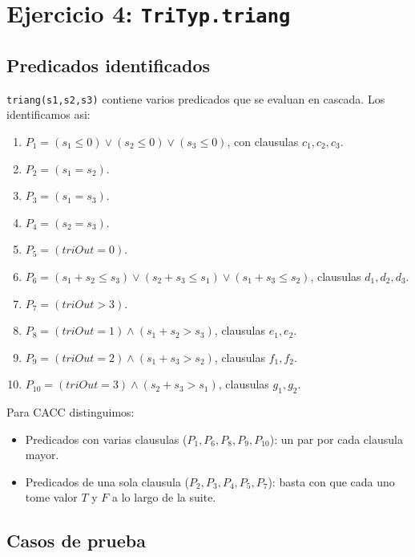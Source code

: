 \documentclass[12pt,a4paper]{article}
\begin{document}
\section{Ejercicio 4: \texttt{TriTyp.triang}}

\subsection{Predicados identificados}

\texttt{triang(s1,s2,s3)} contiene varios predicados que se evaluan en cascada. Los identificamos
asi:

\begin{enumerate}
  \item $P_1 = (s_1 \le 0) \vee (s_2 \le 0) \vee (s_3 \le 0)$, con clausulas $c_1, c_2, c_3$.
  \item $P_2 = (s_1 = s_2)$.
  \item $P_3 = (s_1 = s_3)$.
  \item $P_4 = (s_2 = s_3)$.
  \item $P_5 = (\textit{triOut} = 0)$.
  \item $P_6 = (s_1+s_2 \le s_3) \vee (s_2+s_3 \le s_1) \vee (s_1+s_3 \le s_2)$, clausulas
  $d_1,d_2,d_3$.
  \item $P_7 = (\textit{triOut} > 3)$.
  \item $P_8 = (\textit{triOut} = 1) \wedge (s_1+s_2 > s_3)$, clausulas $e_1, e_2$.
  \item $P_9 = (\textit{triOut} = 2) \wedge (s_1+s_3 > s_2)$, clausulas $f_1, f_2$.
  \item $P_{10} = (\textit{triOut} = 3) \wedge (s_2+s_3 > s_1)$, clausulas $g_1, g_2$.
\end{enumerate}

Para CACC distinguimos:

\begin{itemize}
  \item Predicados con varias clausulas ($P_1, P_6, P_8, P_9, P_{10}$): un par por cada clausula
  mayor.
  \item Predicados de una sola clausula ($P_2, P_3, P_4, P_5, P_7$): basta con que cada uno tome
  valor $T$ y $F$ a lo largo de la suite.
\end{itemize}

\subsection{Casos de prueba}
\end{document}
